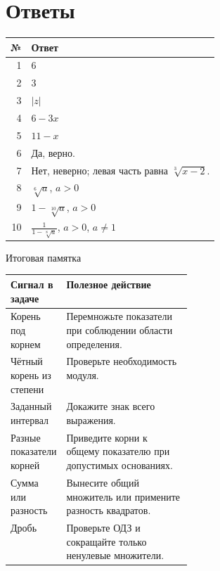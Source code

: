 \documentclass[a4paper,12pt]{article}
\newcommand{\abs}[1]{\left|#1\right|}
\begin{document}
\section*{Ответы}
\renewcommand{\arraystretch}{1.35}
\begin{center}
\begin{tabularx}{\linewidth}{@{}r X@{}}
\toprule
№ & Ответ \\ \midrule
1 & $6$ \\
2 & $3$ \\
3 & $\abs{z}$ \\
4 & $6-3x$ \\
5 & $11-x$ \\
6 & Да, верно. \\
7 & Нет, неверно; левая часть равна $\sqrt[3]{x-2}$. \\
8 & $\sqrt[6]a$, $a>0$ \\
9 & $1-\sqrt[10]a$, $a>0$ \\
10 & $\displaystyle\frac{1}{1-\sqrt[8]a}$, $a>0$, $a\ne1$ \\ \bottomrule
\end{tabularx}
\end{center}
\medskip
\begin{center}\large\color{darkaccent} Итоговая памятка\end{center}
\begin{tabularx}{\linewidth}{@{}p{0.30\linewidth} X@{}}
\toprule
Сигнал в задаче & Полезное действие \\ \midrule
Корень под корнем & Перемножьте показатели при соблюдении области определения. \\
Чётный корень из степени & Проверьте необходимость модуля. \\
Заданный интервал & Докажите знак всего выражения. \\
Разные показатели корней & Приведите корни к общему показателю при допустимых основаниях. \\
Сумма или разность & Вынесите общий множитель или примените разность квадратов. \\
Дробь & Проверьте ОДЗ и сокращайте только ненулевые множители. \\ \bottomrule
\end{tabularx}
\end{document}
